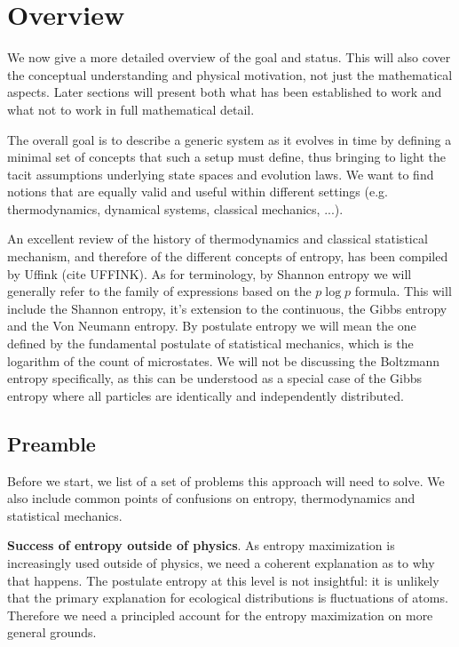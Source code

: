 \documentclass[10pt, onecolumn, longbibliography, nofootinbib]{revtex4-2}
\begin{document}
\section{Overview}

We now give a more detailed overview of the goal and status. This will also cover the conceptual understanding and physical motivation, not just the mathematical aspects. Later sections will present both what has been established to work and what not to work in full mathematical detail.

The overall goal is to describe a generic system as it evolves in time by defining a minimal set of concepts that such a setup must define, thus bringing to light the tacit assumptions underlying state spaces and evolution laws. We want to find notions that are equally valid and useful within different settings (e.g. thermodynamics, dynamical systems, classical mechanics, ...).

An excellent review of the history of thermodynamics and classical statistical mechanism, and therefore of the different concepts of entropy, has been compiled by Uffink (cite UFFINK). As for terminology, by Shannon entropy we will generally refer to the family of expressions based on the $p \log p$ formula. This will include the Shannon entropy, it's extension to the continuous, the Gibbs entropy and the Von Neumann entropy. By postulate entropy we will mean the one defined by the fundamental postulate of statistical mechanics, which is the logarithm of the count of microstates. We will not be discussing the Boltzmann entropy specifically, as this can be understood as a special case of the Gibbs entropy where all particles are identically and independently distributed.

\subsection{Preamble}

Before we start, we list of a set of problems this approach will need to solve. We also include common points of confusions on entropy, thermodynamics and statistical mechanics.

\textbf{Success of entropy outside of physics}. As entropy maximization is increasingly used outside of physics, we need a coherent explanation as to why that happens. The postulate entropy at this level is not insightful: it is unlikely that the primary explanation for ecological distributions is fluctuations of atoms. Therefore we need a principled account for the entropy maximization on more general grounds.
\end{document}
